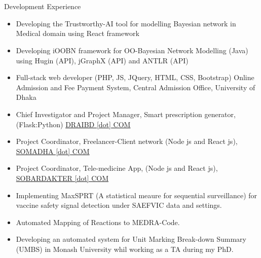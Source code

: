 \section{\faBuilding}{Development Experience}
\begin{itemize}[noitemsep]
    \item Developing the Trustworthy-AI tool for modelling Bayesian network in Medical domain using React framework
    \item Developing iOOBN framework for OO-Bayesian Network Modelling (Java) using Hugin (API), jGraphX (API) and ANTLR (API)
    \item Full-stack web developer (PHP, JS, JQuery, HTML, CSS, Bootstrap)
Online Admission and Fee Payment System, Central Admission Office, University of Dhaka
    \item Chief Investigator and Project Manager, Smart prescription generator, (Flask:Python) \href{http://draibd.com}{DRAIBD [dot] COM}
    \item Project Coordinator, Freelancer-Client network (Node js and React js), \href{https://somadha.com}{SOMADHA [dot] COM}
    \item Project Coordinator, Tele-medicine App, (Node js and React js), \href{https://sobardakter.com}{SOBARDAKTER [dot] COM}
    \item Implementing MaxSPRT (A statistical meaure for sequential surveillance) for vaccine safety signal detection under SAEFVIC data and settings.
    \item Automated Mapping of Reactions to MEDRA-Code.
    \item Developing an automated system for Unit Marking Break-down Summary (UMBS) in Monash University whil working as a TA during my PhD.
\end{itemize}